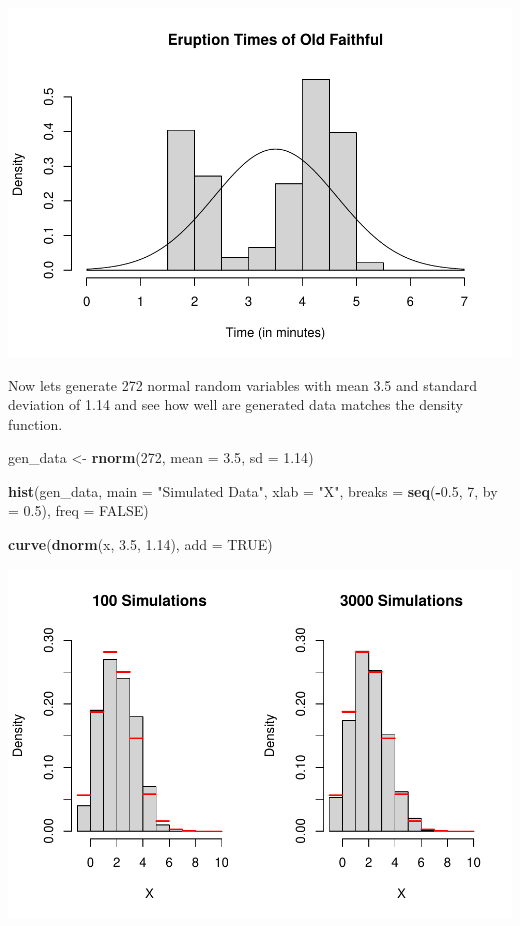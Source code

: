 \documentclass[
]{book}
\newenvironment{Shaded}{\begin{snugshade}}{\end{snugshade}}
\newcommand{\DataTypeTok}[1]{\textcolor[rgb]{0.13,0.29,0.53}{#1}}
\newcommand{\DecValTok}[1]{\textcolor[rgb]{0.00,0.00,0.81}{#1}}
\newcommand{\FloatTok}[1]{\textcolor[rgb]{0.00,0.00,0.81}{#1}}
\newcommand{\KeywordTok}[1]{\textcolor[rgb]{0.13,0.29,0.53}{\textbf{#1}}}
\newcommand{\NormalTok}[1]{#1}
\newcommand{\OperatorTok}[1]{\textcolor[rgb]{0.81,0.36,0.00}{\textbf{#1}}}
\newcommand{\OtherTok}[1]{\textcolor[rgb]{0.56,0.35,0.01}{#1}}
\newcommand{\StringTok}[1]{\textcolor[rgb]{0.31,0.60,0.02}{#1}}
\begin{document}
\includegraphics{_main_files/figure-latex/unnamed-chunk-286-1.pdf}

Now lets generate 272 normal random variables with mean 3.5 and standard deviation of 1.14 and see how well are generated data matches the density function.

\begin{Shaded}
\begin{Highlighting}[]
\NormalTok{gen_data <-}\StringTok{ }\KeywordTok{rnorm}\NormalTok{(}\DecValTok{272}\NormalTok{, }\DataTypeTok{mean =} \FloatTok{3.5}\NormalTok{, }\DataTypeTok{sd =} \FloatTok{1.14}\NormalTok{)}

\KeywordTok{hist}\NormalTok{(gen_data, }\DataTypeTok{main =} \StringTok{"Simulated Data"}\NormalTok{, }\DataTypeTok{xlab =} \StringTok{"X"}\NormalTok{, }\DataTypeTok{breaks =} \KeywordTok{seq}\NormalTok{(}\OperatorTok{-}\FloatTok{0.5}\NormalTok{,}
    \DecValTok{7}\NormalTok{, }\DataTypeTok{by =} \FloatTok{0.5}\NormalTok{), }\DataTypeTok{freq =} \OtherTok{FALSE}\NormalTok{)}

\KeywordTok{curve}\NormalTok{(}\KeywordTok{dnorm}\NormalTok{(x, }\FloatTok{3.5}\NormalTok{, }\FloatTok{1.14}\NormalTok{), }\DataTypeTok{add =} \OtherTok{TRUE}\NormalTok{)}
\end{Highlighting}
\end{Shaded}

\includegraphics{_main_files/figure-latex/unnamed-chunk-287-1.pdf}
\end{document}
